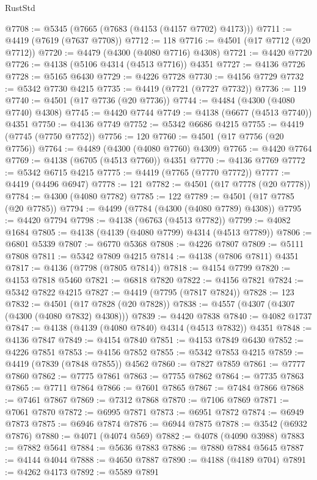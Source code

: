 \begin{lexlean}{RustStd}
\begin{coremodule}
@7708 := @5345 (@7665 (@7683 (@4153 (@4157 @7702) @4173)))
@7711 := @4419 (@7619 (@7637 @7708))
@7712 := 118
@7716 := @4501 (@17 @7712 (@20 @7712))
@7720 := @4479 (@4300 (@4080 @7716) @4308)
@7721 := @4420 @7720
@7726 := @4138 (@5106 @4314 (@4513 @7716)) @4351
@7727 := @4136 @7726
@7728 := @5165 @6430
@7729 := @4226 @7728
@7730 := @4156 @7729
@7732 := @5342 @7730 @4215
@7735 := @4419 (@7721 (@7727 @7732))
@7736 := 119
@7740 := @4501 (@17 @7736 (@20 @7736))
@7744 := @4484 (@4300 (@4080 @7740) @4308)
@7745 := @4420 @7744
@7749 := @4138 (@6677 (@4513 @7740)) @4351
@7750 := @4136 @7749
@7752 := @5342 @6686 @4215
@7755 := @4419 (@7745 (@7750 @7752))
@7756 := 120
@7760 := @4501 (@17 @7756 (@20 @7756))
@7764 := @4489 (@4300 (@4080 @7760) @4309)
@7765 := @4420 @7764
@7769 := @4138 (@6705 (@4513 @7760)) @4351
@7770 := @4136 @7769
@7772 := @5342 @6715 @4215
@7775 := @4419 (@7765 (@7770 @7772))
@7777 := @4419 (@4496 @6947)
@7778 := 121
@7782 := @4501 (@17 @7778 (@20 @7778))
@7784 := @4300 (@4080 @7782)
@7785 := 122
@7789 := @4501 (@17 @7785 (@20 @7785))
@7794 := @4499 (@7784 (@4300 (@4080 @7789) @4308))
@7795 := @4420 @7794
@7798 := @4138 (@6763 (@4513 @7782))
@7799 := @4082 @1684
@7805 := @4138 (@4139 (@4080 @7799) @4314 (@4513 @7789))
@7806 := @6801 @5339
@7807 := @6770 @5368
@7808 := @4226 @7807
@7809 := @5111 @7808
@7811 := @5342 @7809 @4215
@7814 := @4138 (@7806 @7811) @4351
@7817 := @4136 (@7798 (@7805 @7814))
@7818 := @4154 @7799
@7820 := @4153 @7818 @5460
@7821 := @6818 @7820
@7822 := @4156 @7821
@7824 := @5342 @7822 @4215
@7827 := @4419 (@7795 (@7817 @7824))
@7828 := 123
@7832 := @4501 (@17 @7828 (@20 @7828))
@7838 := @4557 (@4307 (@4307 (@4300 (@4080 @7832) @4308)))
@7839 := @4420 @7838
@7840 := @4082 @1737
@7847 := @4138 (@4139 (@4080 @7840) @4314 (@4513 @7832)) @4351
@7848 := @4136 @7847
@7849 := @4154 @7840
@7851 := @4153 @7849 @6430
@7852 := @4226 @7851
@7853 := @4156 @7852
@7855 := @5342 @7853 @4215
@7859 := @4419 (@7839 (@7848 @7855)) @4562
@7860 := @7827 @7859
@7861 := @7777 @7860
@7862 := @7775 @7861
@7863 := @7755 @7862
@7864 := @7735 @7863
@7865 := @7711 @7864
@7866 := @7601 @7865
@7867 := @7484 @7866
@7868 := @7461 @7867
@7869 := @7312 @7868
@7870 := @7106 @7869
@7871 := @7061 @7870
@7872 := @6995 @7871
@7873 := @6951 @7872
@7874 := @6949 @7873
@7875 := @6946 @7874
@7876 := @6944 @7875
@7878 := @3542 (@6932 @7876)
@7880 := @4071 (@4074 @569)
@7882 := @4078 (@4090 @3988)
@7883 := @7882 @5641
@7884 := @5636 @7883
@7886 := @7880 @7884 @5645
@7887 := @4144 @4044
@7888 := @4650 @7887
@7890 := @4188 (@4189 @704)
@7891 := @4262 @4173
@7892 := @5589 @7891

\end{coremodule}
\end{lexlean}
